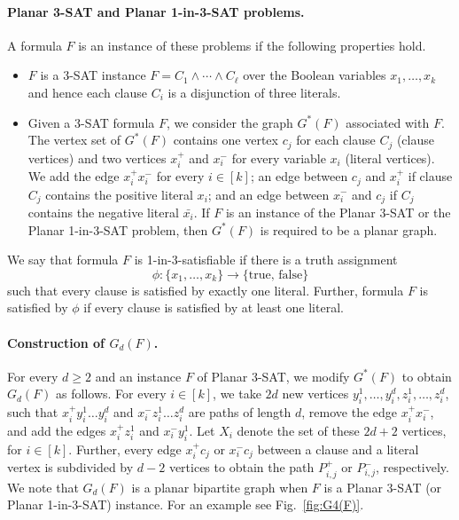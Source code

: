 \documentclass[12pt]{article}
\begin{document}
\paragraph{Planar 3-SAT and Planar 1-in-3-SAT problems.}
A formula $F$ is an instance of these problems if the following properties hold.
\begin{itemize}
    \item[(i)] $F$ is a 3-SAT instance $F= C_1 \wedge \cdots \wedge C_\ell$ over the Boolean variables $x_1, \dots, x_k$ and hence each clause $C_i$ is a disjunction of three literals.
    \item[(ii)] Given a 3-SAT formula $F$, we consider the graph $G^*(F)$ associated with $F$. The vertex set of $G^*(F)$ contains one vertex $c_j$ for each clause $C_j$ (clause vertices) and two vertices $x_i^+$ and $x_i^-$ for every variable $x_i$ (literal vertices). We add the edge $x_i^+x_i^-$ for every $i \in [k]$; an edge between $c_j$ and $x_i^+$ if clause $C_j$ contains the positive literal $x_i$; and an edge between $x_i^-$ and $c_j$ if $C_j$ contains the negative literal $\bar{x_i}$. If $F$ is an instance of the Planar 3-SAT or the Planar 1-in-3-SAT problem, then $G^*(F)$ is required to be a planar graph.
\end{itemize}
We say that formula $F$ is 1-in-3-satisfiable if there is a truth assignment $$\phi: \{x_1, \dots, x_k\} \rightarrow \{ \mbox{true, false}\}$$ 
such that every clause is satisfied by exactly one literal. Further, formula $F$ is satisfied by $\phi$ if every clause is satisfied by at least one literal.
\paragraph{Construction of $G_d(F)$.}  For every $d \ge 2$ and an instance $F$ of Planar 3-SAT, we modify $G^*(F)$ to obtain $G_d(F)$ as follows. For every $i \in [k]$, we take $2d$ new vertices $y_i^1, \dots , y_i^{d}, z_i^1, \dots, z_i^{d} $, such that $x_i^+y_i^1\dots y_i^d$ and $x_i^- z_i^1 \dots z_i^d$ are paths of length $d$, remove the edge $x_i^+ x_i^-$, and add the edges $x_i^+z_i^1$ and $x_i^-y_i^1$. Let $X_i$ denote the set of these $2d+2$ vertices, for $i \in [k]$.
Further, every edge $x_i^+c_j$ or $x_i^-c_j$ between a clause and a literal vertex is subdivided by $d-2$ vertices to obtain the path $P_{i,j}^+$ or $P_{i,j}^-$, respectively. We note that $G_d(F)$ is a planar bipartite graph when $F$ is a Planar 3-SAT (or Planar 1-in-3-SAT) instance. For an example see Fig.~\ref{fig:G4(F)}. 
\end{document}
